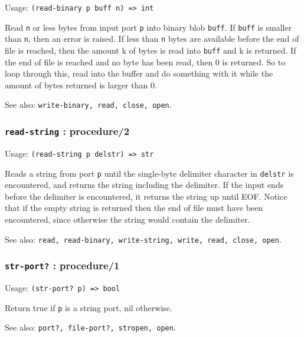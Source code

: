 \documentclass[
]{article}
\newcommand{\passthrough}[1]{#1}
\begin{document}
Usage: \passthrough{\lstinline!(read-binary p buff n) => int!}

Read \passthrough{\lstinline!n!} or less bytes from input port
\passthrough{\lstinline!p!} into binary blob
\passthrough{\lstinline!buff!}. If \passthrough{\lstinline!buff!} is
smaller than \passthrough{\lstinline!n!}, then an error is raised. If
less than \passthrough{\lstinline!n!} bytes are available before the end
of file is reached, then the amount k of bytes is read into
\passthrough{\lstinline!buff!} and k is returned. If the end of file is
reached and no byte has been read, then 0 is returned. So to loop
through this, read into the buffer and do something with it while the
amount of bytes returned is larger than 0.

See also: \passthrough{\lstinline!write-binary, read, close, open!}.

\hypertarget{read-string-procedure2}{%
\subsubsection{\texorpdfstring{\texttt{read-string} :
procedure/2}{read-string : procedure/2}}\label{read-string-procedure2}}

Usage: \passthrough{\lstinline!(read-string p delstr) => str!}

Reads a string from port \passthrough{\lstinline!p!} until the
single-byte delimiter character in \passthrough{\lstinline!delstr!} is
encountered, and returns the string including the delimiter. If the
input ends before the delimiter is encountered, it returns the string up
until EOF. Notice that if the empty string is returned then the end of
file must have been encountered, since otherwise the string would
contain the delimiter.

See also:
\passthrough{\lstinline!read, read-binary, write-string, write, read, close, open!}.

\hypertarget{str-port-procedure1}{%
\subsubsection{\texorpdfstring{\texttt{str-port?} :
procedure/1}{str-port? : procedure/1}}\label{str-port-procedure1}}

Usage: \passthrough{\lstinline!(str-port? p) => bool!}

Return true if \passthrough{\lstinline!p!} is a string port, nil
otherwise.

See also: \passthrough{\lstinline!port?, file-port?, stropen, open!}.
\end{document}

